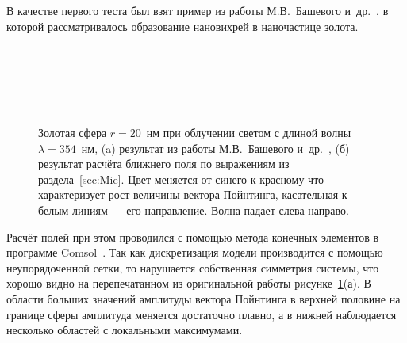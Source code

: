 В качестве первого теста был взят пример из работы М.В.~Башевого
и~др.~\cite{Bashevoy-2005}, в которой рассматривалось образование
нановихрей в наночастице золота. 
\begin{figure}[p]
  \begin{minipage}[ht]{0.99\linewidth}
  \end{minipage}\\
  \vfill
  \begin{minipage}[ht]{0.99\linewidth}
  \end{minipage}\\
  \vfill
  \begin{minipage}[ht]{0.99\linewidth}
  \end{minipage}\\
  \begin{minipage}[ht]{0.99\linewidth}
  \end{minipage}
  \caption{Золотая сфера $r=20$~нм при облучении светом с длиной волны
    $\lambda=354$~нм, (a) результат из работы М.В.~Башевого
    и~др.~\cite{Bashevoy-2005}, (б) результат расчёта ближнего поля по
    выражениям из раздела~\ref{sec:Mie}. Цвет меняется от синего к
    красному что характеризует рост величины вектора Пойнтинга, касательная к
    белым линиям --- его направление. Волна падает слева
    направо.\label{img:vortex}}
\end{figure}
Расчёт полей при этом проводился с помощью метода конечных элементов в
программе Comsol~\cite{Comsol-web}. Так как дискретизация модели производится с помощью
неупорядоченной сетки, то нарушается собственная симметрия системы,
что хорошо видно на перепечатанном из оригинальной работы
рисунке~\ref{img:vortex}(а).  В области больших значений амплитуды
вектора Пойнтинга в верхней половине на границе сферы амплитуда
меняется достаточно плавно, а в нижней наблюдается несколько областей
с локальными максимумами.

